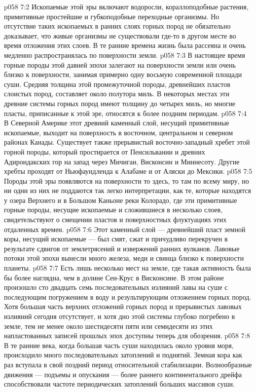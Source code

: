 \vs p058 7:2 Ископаемые этой эры включают водоросли, кораллоподобные растения, примитивные простейшие и губкоподобные переходные организмы. Но отсутствие таких ископаемых в ранних слоях горных пород не обязательно доказывает, что живые организмы не существовали где\hyp{}то в другом месте во время отложения этих слоев. В те ранние времена жизнь была рассеяна и очень медленно распространялась по поверхности земли.
\vs p058 7:3 \pc В настоящее время горные породы этой давней эпохи залегают на поверхности земли или очень близко к поверхности, занимая примерно одну восьмую современной площади суши. Средняя толщина этой промежуточной породы, древнейших пластов слоистых пород, составляет около полутора миль. В некоторых местах эти древние системы горных пород имеют толщину до четырех миль, но многие пласты, приписанные к этой эре, относятся к более поздним периодам.
\vs p058 7:4 В Северной Америке этот древний каменный слой, несущий примитивные ископаемые, выходит на поверхность в восточном, центральном и северном районах Канады. Существует также прерывистый восточно\hyp{}западный хребет этой горной породы, который простирается от Пенсильвании и древних Адирондакских гор на запад через Мичиган, Висконсин и Миннесоту. Другие хребты проходят от Ньюфаундленда к Алабаме и от Аляски до Мексики.
\vs p058 7:5 Породы этой эры появляются на поверхности то здесь, то там по всему миру, но ни одни из них не поддаются так легко интерпретации, как те, которые находятся у озера Верхнего и в Большом Каньоне реки Колорадо, где эти примитивные горные породы, несущие ископаемые и сложившиеся в несколько слоев, свидетельствуют о смещении пластов и поверхностных флуктуациях этих отдаленных времен.
\vs p058 7:6 Этот каменный слой --- древнейший пласт земной коры, несущий ископаемые --- был смят, сжат и причудливо перекручен в результате сдвигов от землетрясений и извержений ранних вулканов. Лавовые потоки этой эпохи вынесли много железа, меди и свинца близко к поверхности планеты.
\vs p058 7:7 Есть лишь несколько мест на земле, где такая активность была бы более наглядна, чем в долине Сен\hyp{}Крус в Висконсине. В этом районе произошло сто двадцать семь последовательных излияний лавы на суше с последующим погружением в воду и результирующим отложением горных пород. Хотя большая часть верхних отложений горных пород и прерывистых лавовых излияний сегодня отсутствует, и хотя дно этой системы глубоко погребено в земле, тем не менее около шестидесяти пяти или семидесяти из этих напластованных записей прошлых эпох доступны теперь для обозрения.
\vs p058 7:8 \pc В те ранние века, когда большая часть суши находилась около уровня моря, происходило много последовательных затоплений и поднятий. Земная кора как раз вступала в свой поздний период относительной стабилизации. Волнообразные движения --- подъемы и опускания --- более раннего континентального дрейфа способствовали частоте периодических затоплений больших массивов суши.
